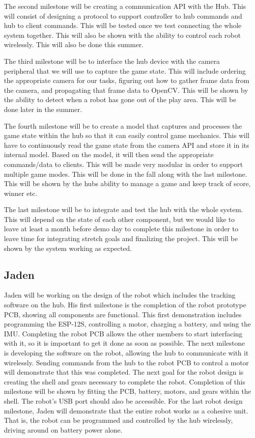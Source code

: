 \documentclass[11pt]{ieeeconf}
\begin{document}
The second milestone will be creating a communication API with the Hub. This will consist of designing a protocol to support controller to hub commands and hub to client commands. This will be tested once we test connecting the whole system together. This will also be shown with the ability to control each robot wirelessly. This will also be done this summer.

The third milestone will be to interface the hub device with the camera peripheral that we will use to capture the game state. This will include ordering the appropriate camera for our tasks, figuring out how to gather frame data from the camera, and propagating that frame data to OpenCV. This will be shown by the ability to detect when a robot has gone out of the play area. This will be done later in the summer.

The fourth milestone will be to create a model that captures and processes the game state within the hub so that it can easily control game mechanics. This will have to continuously read the game state from the camera API and store it in its internal model. Based on the model, it will then send the appropriate commands/data to clients. This will be made very modular in order to support multiple game modes. This will be done in the fall along with the last milestone. This will be shown by the hubs ability to manage a game and keep track of score, winner etc.

The last milestone will be to integrate and test the hub with the whole system. This will depend on the state of each other component, but we would like to leave at least a month before demo day to complete this milestone in order to leave time for integrating stretch goals and finalizing the project. This will be shown by the system working as expected.

\subsection{Jaden}
Jaden will be working on the design of the robot which includes the tracking software on the hub. His first milestone is the completion of the robot prototype PCB, showing all components are functional. This first demonstration includes programming the ESP-12S, controlling a motor, charging a battery, and using the IMU. Completing the robot PCB allows the other members to start interfacing with it, so it is important to get it done as soon as possible. The next milestone is developing the software on the robot, allowing the hub to communicate with it wirelessly. Sending commands from the hub to the robot PCB to control a motor will demonstrate that this was completed. The next goal for the robot design is creating the shell and gears necessary to complete the robot. Completion of this milestone will be shown by fitting the PCB, battery, motors, and gears within the shell. The robot's USB port should also be accessible. For the last robot design milestone, Jaden will demonstrate that the entire robot works as a cohesive unit. That is, the robot can be programmed and controlled by the hub wirelessly, driving around on battery power alone.
\end{document}
